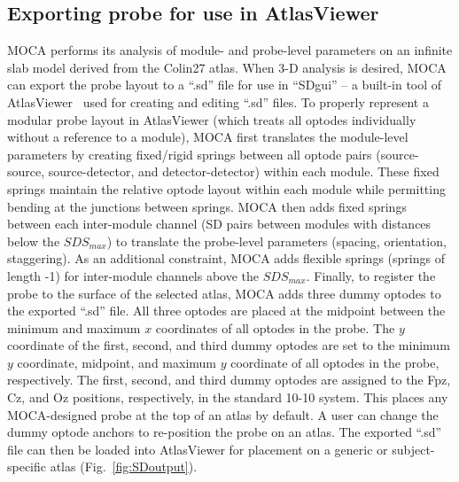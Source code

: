 \subsection{Exporting probe for use in AtlasViewer}
MOCA performs its analysis of module- and probe-level parameters on an infinite slab model derived from the Colin27 atlas. When 3-D analysis is desired, MOCA can export the probe layout to a ``.sd'' file for use in ``SDgui'' -- a built-in tool of AtlasViewer~\cite{Aasted2015} used for creating and editing ``.sd'' files. To properly represent a modular probe layout in AtlasViewer (which treats all optodes individually without a reference to a module), MOCA first translates the module-level parameters by creating fixed/rigid springs between all optode pairs (source-source, source-detector, and detector-detector) within each module. These fixed springs maintain the relative optode layout within each module while permitting bending at the junctions between springs. MOCA then adds fixed springs between each inter-module channel (SD pairs between modules with distances below the $SDS_{max}$) to translate the probe-level parameters (spacing, orientation, staggering). As an additional constraint, MOCA adds flexible springs (springs of length -1) for inter-module channels above the $SDS_{max}$. Finally, to register the probe to the surface of the selected atlas, MOCA adds three dummy optodes to the exported ``.sd'' file. All three optodes are placed at the midpoint between the minimum and maximum $x$ coordinates of all optodes in the probe. The $y$ coordinate of the first, second, and third dummy optodes are set to the minimum $y$ coordinate, midpoint, and maximum $y$ coordinate of all optodes in the probe, respectively. The first, second, and third dummy optodes are assigned to the Fpz, Cz, and Oz positions, respectively, in the standard 10-10 system. This places any MOCA-designed probe at the top of an atlas by default. A user can change the dummy optode anchors to re-position the probe on an atlas. The exported ``.sd'' file can then be loaded into AtlasViewer for placement on a generic or subject-specific atlas (Fig.~\ref{fig:SDoutput}).


